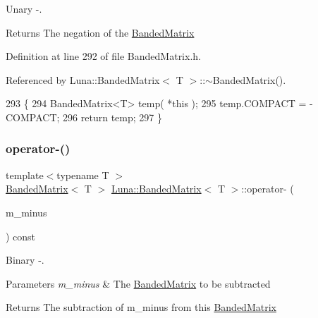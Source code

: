 Unary -\/. 

\begin{DoxyReturn}{Returns}
The negation of the \hyperlink{classLuna_1_1BandedMatrix}{Banded\+Matrix} 
\end{DoxyReturn}


Definition at line 292 of file Banded\+Matrix.\+h.



Referenced by Luna\+::\+Banded\+Matrix$<$ T $>$\+::$\sim$\+Banded\+Matrix().


\begin{DoxyCode}
293   \{
294     BandedMatrix<T> temp( *\textcolor{keyword}{this} );
295     temp.COMPACT = - COMPACT;
296     \textcolor{keywordflow}{return} temp;
297   \}
\end{DoxyCode}
\mbox{\label{classLuna_1_1BandedMatrix_ae4728572d92875bf8eb405be5a298079}} 
\subsubsection{\texorpdfstring{operator-\/()}{operator-()}\hspace{0.1cm}{\footnotesize\ttfamily [2/2]}}
{\footnotesize\ttfamily template$<$typename T $>$ \\
\hyperlink{classLuna_1_1BandedMatrix}{Banded\+Matrix}$<$ T $>$ \hyperlink{classLuna_1_1BandedMatrix}{Luna\+::\+Banded\+Matrix}$<$ T $>$\+::operator-\/ (\begin{DoxyParamCaption}\item[{const \hyperlink{classLuna_1_1BandedMatrix}{Banded\+Matrix}$<$ T $>$ \&}]{m\+\_\+minus }\end{DoxyParamCaption}) const\hspace{0.3cm}{\ttfamily [inline]}}



Binary -\/. 


\begin{DoxyParams}{Parameters}
{\em m\+\_\+minus} & The \hyperlink{classLuna_1_1BandedMatrix}{Banded\+Matrix} to be subtracted \\
\hline
\end{DoxyParams}
\begin{DoxyReturn}{Returns}
The subtraction of m\+\_\+minus from this \hyperlink{classLuna_1_1BandedMatrix}{Banded\+Matrix} 
\end{DoxyReturn}


